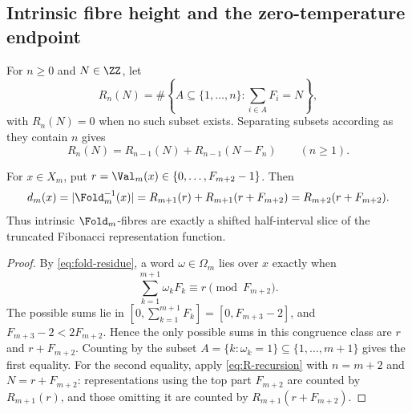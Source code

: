 \subsection{Intrinsic fibre height and the zero-temperature endpoint}
\label{ssec:intrinsic-height-zero-temperature}

For \(n\ge0\) and \(N\in\ZZ\), let
\[
  R_n(N)=\#\left\{A\subseteq\{1,\ldots,n\}:
  \sum_{i\in A}F_i=N\right\},
\]
with \(R_n(N)=0\) when no such subset exists.  Separating subsets according as
they contain \(n\) gives
\begin{equation}\label{eq:R-recursion}
  R_n(N)=R_{n-1}(N)+R_{n-1}(N-F_n)
  \qquad(n\ge1).
\end{equation}

\begin{lemma}
\label{lem:fold-fibre-representation-pairing}
For \(x\in X_m\), put \(r=\Val_m(x)\in\{0,\ldots,F_{m+2}-1\}\).  Then
\[
  d_m(x)=|\Fold_m^{-1}(x)|
  =R_{m+1}(r)+R_{m+1}(r+F_{m+2})
  =R_{m+2}(r+F_{m+2}).
\]
Thus intrinsic \(\Fold_m\)-fibres are exactly a shifted half-interval slice of
the truncated Fibonacci representation function.
\end{lemma}

\begin{proof}
By \eqref{eq:fold-residue}, a word \(\omega\in\Omega_m\) lies over \(x\) exactly
when
\[
  \sum_{k=1}^{m+1}\omega_kF_k\equiv r\pmod {F_{m+2}} .
\]
The possible sums lie in
\([0,\sum_{k=1}^{m+1}F_k]=[0,F_{m+3}-2]\), and
\(F_{m+3}-2<2F_{m+2}\).  Hence the only possible sums in this congruence class
are \(r\) and \(r+F_{m+2}\).  Counting by the subset
\(A=\{k:\omega_k=1\}\subseteq\{1,\ldots,m+1\}\) gives the first equality.
For the second equality, apply \eqref{eq:R-recursion} with
\(n=m+2\) and \(N=r+F_{m+2}\): representations using the top part
\(F_{m+2}\) are counted by \(R_{m+1}(r)\), and those omitting it are counted by
\(R_{m+1}(r+F_{m+2})\).
\end{proof}

